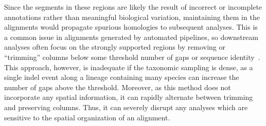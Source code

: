 \documentclass[10pt,letterpaper]{article}
\begin{document}

Since the segments in these regions are likely the result of incorrect or incomplete annotations rather than meaningful biological variation, maintaining them in the alignments would propagate spurious homologies to subsequent analyses. This is a common issue in alignments generated by automated pipelines, so downstream analyses often focus on the strongly supported regions by removing or “trimming” columns below some threshold number of gaps or sequence identity~\cite{Castresana2000, CapellaGutierrez2009}. This approach, however, is inadequate if the taxonomic sampling is dense, as a single indel event along a lineage containing many species can increase the number of gaps above the threshold. Moreover, as this method does not incorporate any spatial information, it can rapidly alternate between trimming and preserving columns. Thus, it can severely disrupt any analyses which are sensitive to the spatial organization of an alignment.
\end{document}
